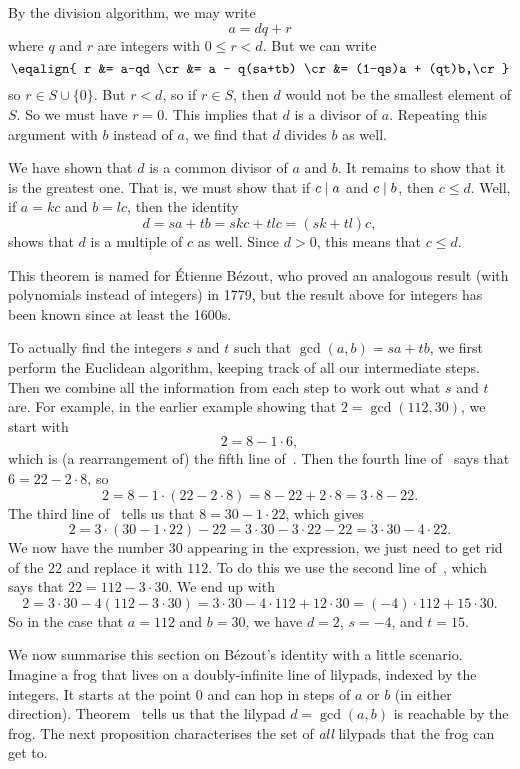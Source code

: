By the division algorithm, we may write
$$a = dq+r$$
where $q$ and $r$ are integers with $0\le r<d$. But we can write
$$\eqalign{
r &= a-qd \cr
&= a - q(sa+tb) \cr
&= (1-qs)a + (qt)b,\cr
}$$ so $r\in S\cup \{0\}$. But $r < d$, so if $r\in S$, then $d$ would not be the smallest
element of $S$. So we must have $r = 0$. This implies that $d$ is a divisor of $a$.
Repeating this argument with $b$ instead of $a$, we find that $d$ divides $b$ as well.

We have shown that $d$ is a common divisor of $a$ and $b$. It remains to show that it is the greatest
one. That is, we must show that if $c\mid a$ and $c\mid b$, then $c\le d$. Well, if
$a = kc$ and $b=lc$, then the identity
$$d = sa+tb = skc + tlc = (sk+tl)c,$$
shows that $d$ is a multiple of $c$ as well. Since $d>0$, this means that $c\le d$.\slug

This theorem is named for \'Etienne B\'ezout, who proved an analogous result (with polynomials
instead of integers) in 1779, but the result above for integers has been known since at least
the 1600s.

To actually find the integers $s$ and $t$ such that $\gcd(a,b) = sa + tb$, we
first perform the Euclidean algorithm, keeping track of all our intermediate steps. Then we combine
all the information from each step to work out what $s$ and $t$ are.
For example, in the earlier example showing that $2 = \gcd(112,30)$, we start with
$$ 2 = 8- 1\cdot 6,$$
which is (a rearrangement of) the fifth line of~.
Then the fourth line of~ says that $6=22-2\cdot 8$, so
$$ 2 = 8 - 1\cdot (22-2\cdot 8) = 8 - 22 + 2\cdot 8 = 3\cdot 8 - 22.$$
The third line of~ tells us that $8 = 30-1\cdot 22$, which gives
$$ 2 = 3\cdot (30-1\cdot 22) - 22 = 3\cdot 30 - 3\cdot 22 - 22 = 3\cdot 30 - 4\cdot 22.$$
We now have the number $30$ appearing in the expression, we just need to get rid of the $22$
and replace it with $112$. To do this we use the second line of~, which
says that $22 = 112-3\cdot 30$. We end up with
$$ 2= 3\cdot 30 - 4(112-3\cdot 30) = 3\cdot 30 - 4\cdot 112 + 12\cdot 30 = (-4)\cdot 112 + 15\cdot 30.$$
So in the case that $a = 112$ and $b=30$, we have $d = 2$, $s = -4$, and $t = 15$.

We now summarise this section on B\'ezout's identity with a little scenario.
Imagine a frog that lives on a doubly-infinite line of lilypads,
indexed by the integers. It starts at the point $0$
and can hop in steps of $a$ or $b$ (in either direction). Theorem~{\thmbezout} tells us
that the lilypad $d = \gcd(a,b)$ is reachable by the frog. The next proposition characterises
the set of {\it all} lilypads that the frog can get to.

